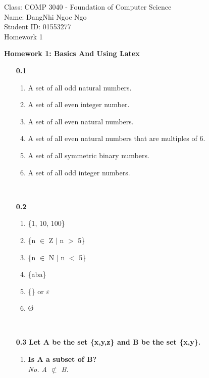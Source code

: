 \documentclass[12pt]{letter}
\begin{document}
Class: COMP 3040 - Foundation of Computer Science \\ Name: DangNhi Ngoc Ngo \\ Student ID: 01553277 \\ Homework 1

\centering\textbf{Homework 1: Basics And Using Latex}

\flushleft

\begin{enumerate}
\item[\textbf{0.1}]
\ \\ %
\begin{enumerate}
	\item A set of all odd natural numbers.

	\item A set of all even integer number.

	\item A set of all even natural numbers.

	\item A set of all even natural numbers that are multiples of 6.

	\item A set of all symmetric binary numbers.

	\item A set of all odd integer numbers.
\end{enumerate}
\ \\ %
\item[\textbf{0.2}]
\ \\ %
\begin{enumerate}
	\item \{1, 10, 100\}

	\item \{n $\in$ Z $|$ n $>$ 5\}

	\item \{n $\in$ N $|$ n $<$ 5\}

	\item \{aba\}
	
	\item \{\} or $\varepsilon$

	\item \O
\end{enumerate}
\ \\ %
\item[\textbf{0.3}] \textbf{Let A be the set \{x,y,z\} and B be the set \{x,y\}.}
\ \\ %
\begin{enumerate}
	\item \textbf{Is A a subset of B?} \\
				\textit{No. A $\not\subset$ B.}


\end{enumerate}
\end{enumerate}
\end{document}
